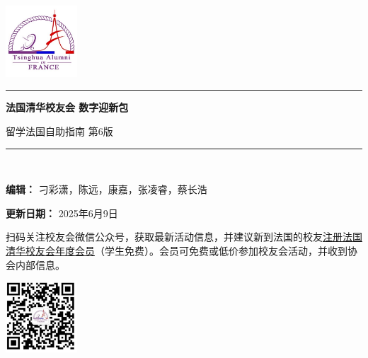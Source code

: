 \documentclass[UTF8]{ctexart}
\newcommand\titleofdoc{\bfseries 法国清华校友会 数字迎新包}
\begin{document}
\begin{titlepage}
   \begin{center}
   
        \vspace{4 cm} 
        
        {\includegraphics[width=0.2\textwidth]{images/Logo.jpg}}\\

        \vspace{0.5 cm} 
        
        \noindent\rule[0.25\baselineskip]{\textwidth}{1pt}
        
        \vspace{0.5 cm} 
        
        \Huge{\titleofdoc} 

        \vspace{0.5cm}
        
        \LARGE{留学法国自助指南 第6版}
        
        \vspace{1 cm} 
        
        \noindent\rule[0.25\baselineskip]{\textwidth}{1pt}\\
        
        \vspace{1 cm}

        \large{\textbf{编辑：} 刁彩潇，陈远，康嘉，张凌睿，蔡长浩}\\

        \vspace{0.3 cm}

        \large{\textbf{更新日期：} 2025年6月9日}\\

        \vspace{1 cm}

        \large{扫码关注校友会微信公众号，获取最新活动信息，并建议新到法国的校友\href{https://www.tsinghua-france.org/about/registration/}{注册法国清华校友会年度会员}（学生免费）。会员可免费或低价参加校友会活动，并收到协会内部信息。}
        
        \vspace{0.5 cm} 
        {\includegraphics[width=0.2\textwidth]{images/QRcode.png}}\\

        \vspace{1 cm} 

    \end{center}
\setcounter{page}{0}
\end{titlepage}
\end{document}
